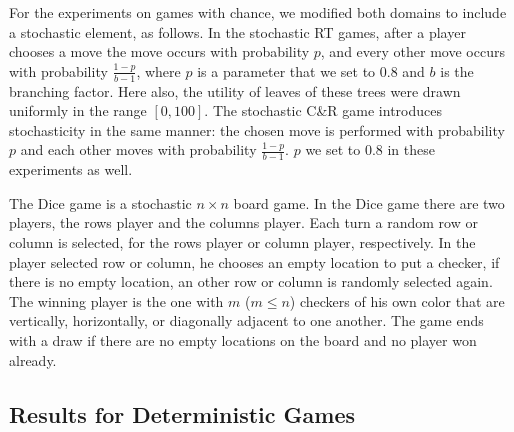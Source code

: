 \documentclass[runningheads]{llncs}
\newcommand{\vmax}{v_{\text{max}}}
\newcommand{\vmin}{v_{\text{min}}}
\begin{document}
For the experiments on games with chance, we modified both domains to include a stochastic element, as follows. In the stochastic RT games, after a player chooses a move the move occurs with probability $p$, and every other move occurs with probability $\frac{1-p}{b-1}$, where $p$ is a parameter that we set to $0.8$ and $b$ is the branching factor. Here also, the utility of leaves of these trees were drawn uniformly in the range $[0, 100]$. %
The stochastic C\&R game introduces stochasticity in the same manner: the chosen move is performed with probability $p$ and each other moves with probability $\frac{1-p}{b-1}$. $p$ we set to 0.8 in these experiments as well. 

The Dice game is a stochastic $n \times n$ board game. In the Dice game there are two players, the rows player and the columns player. Each turn a random row or column is selected, for the rows player or column player, respectively. In the player selected row or column, he chooses an empty location to put a checker, if there is no empty location, an other row or column is randomly selected again. The winning player is the one with $m$ ($m \leq n$) checkers of his own color that are vertically, horizontally, or diagonally adjacent to one another. The game ends with a draw if there are no empty locations on the board and no player won already.



\subsection{Results for Deterministic Games}

\end{document}
